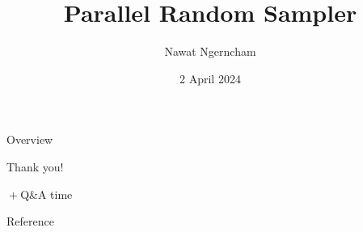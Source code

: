 \documentclass[aspectratio=169]{beamer}
\title{Parallel Random Sampler}
\author{Nawat Ngerncham}
\date{2 April 2024}
\begin{document}
\begin{frame}
  \titlepage
\end{frame}

\begin{frame}{Overview}
  \tableofcontents
\end{frame}






\begin{frame}
    \begin{center}
        \Huge{Thank you!}

        \Large{\({}+{}\)Q\&A time}
    \end{center}    
\end{frame}

\begin{frame}{Reference}
  
  
\end{frame}
\end{document}
